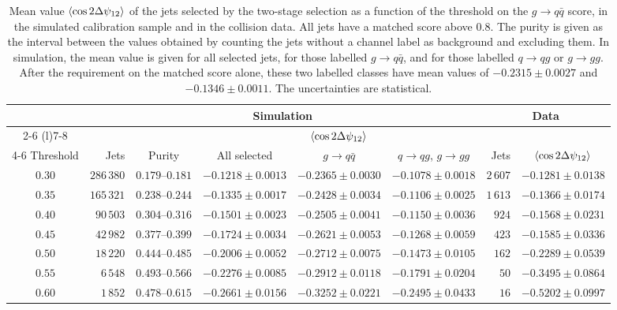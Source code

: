 \begin{table}[htbp]
  \centering
  \caption{Mean value $\langle \cos 2\Delta\psi_{12} \rangle$ of the jets selected by the
  two-stage selection as a function of the threshold on the $g \to q\bar{q}$
  score, in the simulated calibration sample and in the collision data. All jets
  have a matched score above $0.8$. The purity is given as the interval between
  the values obtained by counting the jets without a channel label as background and
  excluding them. In simulation, the mean value is given for all selected jets,
  for those labelled $g \to q\bar{q}$, and for those labelled $q \to qg$ or
  $g \to gg$. After the requirement on the matched score alone, these two labelled
  classes have mean values of $-0.2315 \pm 0.0027$ and $-0.1346 \pm 0.0011$. The
  uncertainties are statistical.}
  \label{tab:modulation-scan}
  \footnotesize
  \setlength{\tabcolsep}{4pt}
  \begin{tabular}{crccccrc}
    \toprule
    & \multicolumn{5}{c}{Simulation} & \multicolumn{2}{c}{Data} \\
    \cmidrule(lr){2-6} \cmidrule(l){7-8}
    & & & \multicolumn{3}{c}{$\langle \cos 2\Delta\psi_{12} \rangle$} & & \\
    \cmidrule(lr){4-6}
    Threshold & Jets & Purity & All selected & $g \to q\bar{q}$ & $q \to qg$, $g \to gg$
              & Jets & $\langle \cos 2\Delta\psi_{12} \rangle$ \\
    \midrule
    $0.30$ & $286\,380$ & $0.179$--$0.181$ & $-0.1218 \pm 0.0013$ & $-0.2365 \pm 0.0030$ & $-0.1078 \pm 0.0018$ & $2\,607$ & $-0.1281 \pm 0.0138$ \\
    $0.35$ & $165\,321$ & $0.238$--$0.244$ & $-0.1335 \pm 0.0017$ & $-0.2428 \pm 0.0034$ & $-0.1106 \pm 0.0025$ & $1\,613$ & $-0.1366 \pm 0.0174$ \\
    $0.40$ & $90\,503$  & $0.304$--$0.316$ & $-0.1501 \pm 0.0023$ & $-0.2505 \pm 0.0041$ & $-0.1150 \pm 0.0036$ & $924$    & $-0.1568 \pm 0.0231$ \\
    $0.45$ & $42\,982$  & $0.377$--$0.399$ & $-0.1724 \pm 0.0034$ & $-0.2621 \pm 0.0053$ & $-0.1268 \pm 0.0059$ & $423$    & $-0.1585 \pm 0.0336$ \\
    $0.50$ & $18\,220$  & $0.444$--$0.485$ & $-0.2006 \pm 0.0052$ & $-0.2712 \pm 0.0075$ & $-0.1473 \pm 0.0105$ & $162$    & $-0.2289 \pm 0.0539$ \\
    $0.55$ & $6\,548$   & $0.493$--$0.566$ & $-0.2276 \pm 0.0085$ & $-0.2912 \pm 0.0118$ & $-0.1791 \pm 0.0204$ & $50$     & $-0.3495 \pm 0.0864$ \\
    $0.60$ & $1\,852$   & $0.478$--$0.615$ & $-0.2661 \pm 0.0156$ & $-0.3252 \pm 0.0221$ & $-0.2495 \pm 0.0433$ & $16$     & $-0.5202 \pm 0.0997$ \\
    \bottomrule
  \end{tabular}
\end{table}

